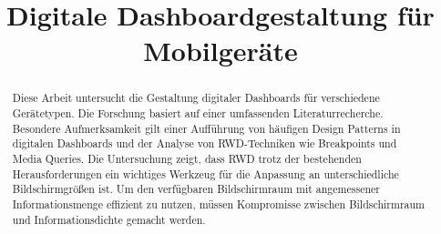 \documentclass[conference,compsoc,final,a4paper]{IEEEtran}
\newcommand{\autoren}[0]{Wittmann, Yan}
\newcommand{\dokumententitel}[0]{Digitale Dashboardgestaltung für Mobilgeräte}
\begin{document}
    \title{\dokumententitel}

    \author{
        \IEEEauthorblockN{\autoren}
    }

    \maketitle
    \thispagestyle{plain}
    \pagestyle{plain}


    \begin{abstract}

        Diese Arbeit untersucht die Gestaltung digitaler Dashboards für verschiedene Gerätetypen.
        Die Forschung basiert auf einer umfassenden Literaturrecherche.
        Besondere Aufmerksamkeit gilt einer Aufführung von häufigen Design Patterns in digitalen Dashboards und der Analyse von \acs{RWD}-Techniken wie Breakpoints und Media Queries.
        Die Untersuchung zeigt, dass \acs{RWD} trotz der bestehenden Herausforderungen ein wichtiges Werkzeug für die Anpassung an unterschiedliche Bildschirmgrößen ist.
        Um den verfügbaren Bildschirmraum mit angemessener Informationsmenge effizient zu nutzen, müssen Kompromisse zwischen Bildschirmraum und Informationsdichte gemacht werden.

    \end{abstract}

    \small\tableofcontents

\end{document}
